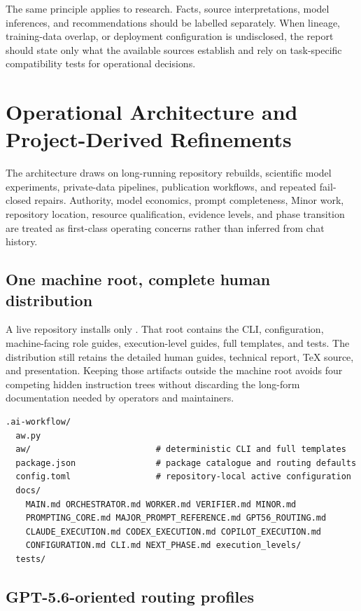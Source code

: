 \documentclass[11pt,a4paper]{article}
\newcommand{\code}[1]{\texttt{\detokenize{#1}}}
\begin{document}
The same principle applies to research. Facts, source interpretations, model inferences, and recommendations should be labelled separately. When lineage, training-data overlap, or deployment configuration is undisclosed, the report should state only what the available sources establish and rely on task-specific compatibility tests for operational decisions.


\section{Operational Architecture and Project-Derived Refinements}\label{sec:v5620}

The architecture draws on long-running repository rebuilds, scientific model experiments,
private-data pipelines, publication workflows, and repeated fail-closed repairs. Authority, model
economics, prompt completeness, Minor work, repository location, resource qualification, evidence
levels, and phase transition are treated as first-class operating concerns rather than inferred from
chat history.

\subsection{One machine root, complete human distribution}

A live repository installs only \code{.ai-workflow/}. That root contains the \code{aw} CLI,
configuration, machine-facing role guides, execution-level guides, full templates, and tests. The
distribution still retains the detailed human guides, technical report, TeX source, and presentation.
Keeping those artifacts outside the machine root avoids four competing hidden instruction trees
without discarding the long-form documentation needed by operators and maintainers.

\begin{lstlisting}[style=workflow]
.ai-workflow/
  aw.py
  aw/                         # deterministic CLI and full templates
  package.json                # package catalogue and routing defaults
  config.toml                 # repository-local active configuration
  docs/
    MAIN.md ORCHESTRATOR.md WORKER.md VERIFIER.md MINOR.md
    PROMPTING_CORE.md MAJOR_PROMPT_REFERENCE.md GPT56_ROUTING.md
    CLAUDE_EXECUTION.md CODEX_EXECUTION.md COPILOT_EXECUTION.md
    CONFIGURATION.md CLI.md NEXT_PHASE.md execution_levels/
  tests/
\end{lstlisting}

\subsection{GPT-5.6-oriented routing profiles}
\end{document}
